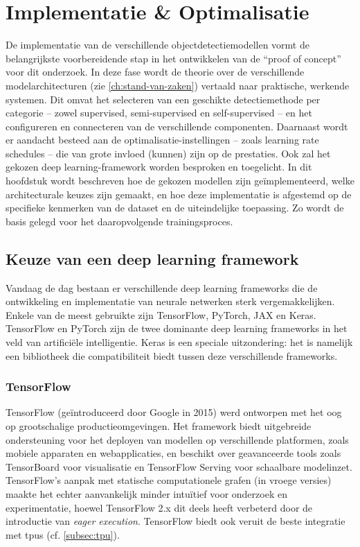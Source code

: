 \chapter{Implementatie \& Optimalisatie}
\label{ch:implementatie}

De implementatie van de verschillende objectdetectiemodellen vormt de belangrijkste voorbereidende stap in het ontwikkelen van de ``proof of concept'' voor dit onderzoek. In deze fase wordt de theorie over de verschillende modelarchitecturen (zie \ref{ch:stand-van-zaken}) vertaald naar praktische, werkende systemen. Dit omvat het selecteren van een geschikte detectiemethode per categorie -- zowel supervised, semi-supervised en self-supervised -- en het configureren en connecteren van de verschillende componenten. Daarnaast wordt er aandacht besteed aan de optimalisatie-instellingen -- zoals learning rate schedules -- die van grote invloed (kunnen) zijn op de prestaties. Ook zal het gekozen deep learning-framework worden besproken en toegelicht. In dit hoofdstuk wordt beschreven hoe de gekozen modellen zijn geïmplementeerd, welke architecturale keuzes zijn gemaakt, en hoe deze implementatie is afgestemd op de specifieke kenmerken van de dataset en de uiteindelijke toepassing. Zo wordt de basis gelegd voor het daaropvolgende trainingsproces.

\section{Keuze van een deep learning framework}

Vandaag de dag bestaan er verschillende deep learning frameworks die de ontwikkeling en implementatie van neurale netwerken sterk vergemakkelijken. Enkele van de meest gebruikte zijn TensorFlow, PyTorch, JAX en Keras. TensorFlow en PyTorch zijn de twee dominante deep learning frameworks in het veld van artificiële intelligentie. Keras is een speciale uitzondering: het is namelijk een bibliotheek die compatibiliteit biedt tussen deze verschillende frameworks.

\subsection{TensorFlow}

TensorFlow (geïntroduceerd door Google in 2015) werd ontworpen met het oog op grootschalige productieomgevingen. Het framework biedt uitgebreide ondersteuning voor het deployen van modellen op verschillende platformen, zoals mobiele apparaten en webapplicaties, en beschikt over geavanceerde tools zoals TensorBoard voor visualisatie en TensorFlow Serving voor schaalbare modelinzet. TensorFlow’s aanpak met statische computationele grafen (in vroege versies) maakte het echter aanvankelijk minder intuïtief voor onderzoek en experimentatie, hoewel TensorFlow 2.x dit deels heeft verbeterd door de introductie van \emph{eager execution}. TensorFlow biedt ook veruit de beste integratie met \glspl{tpu} (cf. \ref{subsec:tpu}). \autocite{Pang_2019}

